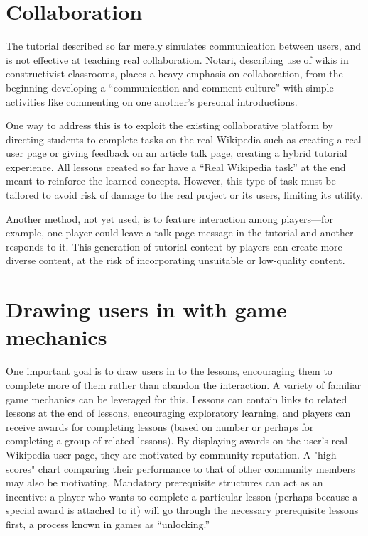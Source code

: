 \documentclass{acm_proc_article-sp}
\begin{document}
\section{Collaboration}

The tutorial described so far merely simulates communication between users, and is not effective at teaching real collaboration. Notari,\cite{Notari:2006} describing use of wikis in constructivist classrooms, places a heavy emphasis on collaboration, from the beginning developing a ``communication and comment culture'' with simple activities like commenting on one another's personal introductions.

One way to address this is to exploit the existing collaborative platform by directing students to complete tasks on the real Wikipedia such as creating a real user page or giving feedback on an article talk page, creating a hybrid tutorial experience. All lessons created so far have a ``Real Wikipedia task'' at the end meant to reinforce the learned concepts. However, this type of task must be tailored to avoid risk of damage to the real project or its users, limiting its utility.

Another method, not yet used, is to feature interaction among players---for example, one player could leave a talk page message in the tutorial and another responds to it. This generation of tutorial content by players can create more diverse content, at the risk of incorporating unsuitable or low-quality content.

\section{Drawing users in with game mechanics}

One important goal is to draw users in to the lessons, encouraging them to complete more of them rather than abandon the interaction. A variety of familiar game mechanics can be leveraged for this. Lessons can contain links to related lessons at the end of lessons, encouraging exploratory learning, and players can receive awards for completing lessons (based on number or perhaps for completing a group of related lessons). By displaying awards on the user's real Wikipedia user page, they are motivated by community reputation. A "high scores" chart comparing their performance to that of other community members may also be motivating. Mandatory prerequisite structures can act as an incentive: a player who wants to complete a particular lesson (perhaps because a special award is attached to it) will go through the necessary prerequisite lessons first, a process known in games as ``unlocking.''
\end{document}
